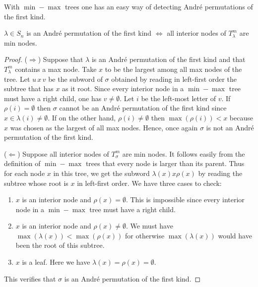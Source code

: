 With $\min-\max$ trees one has an easy way of detecting Andr\'e
permutations of the first kind.
\begin{prop}\label{minandre}
$\lambda \in S_n$ is an Andr\'e permutation of the first kind $\Leftrightarrow$
all interior nodes of $T_\lambda^m$ are min nodes.
\end{prop} 
\begin{proof} ($\Rightarrow$)  Suppose that $\lambda$ is an Andr\'e
permutation of the first kind and that $T^m_\lambda$ contains a max node.
Take $x$ to be the largest among all max nodes of the tree.
Let 
$u\,x\,v$ be the subword of $\sigma$ obtained by reading in left-first
order the subtree that has $x$ as it root. Since every interior node
in a $\min-\max$ tree must have a right child, one has $v \neq \emptyset$.
Let $i$ be the left-most letter of $v$.
If $\rho(i) =\emptyset$ then   $\sigma$ cannot be an Andr\'e 
permutation of the first kind since $x \in \lambda(i) \neq \emptyset$.  If 
on the other hand, $\rho(i) \neq \emptyset$ then $\max (\rho(i)) < x$
because $x$ was chosen as the largest of all max nodes.
Hence, once again $\sigma$ is not an Andr\'e permutation of the first kind.


\noindent
($\Leftarrow$) Suppose all interior nodes of $T_\sigma^m$ are min nodes.
It follows easily from the definition of $\min-\max$ trees that every node is larger
than its parent. Thus for each  node $x$ in this tree, we get the subword $\lambda(x) x \rho(x)$
by reading the subtree whose root is $x$  in left-first order.
We have three cases to check:
\begin{enumerate}
\item $x$ is an interior node and $\rho(x) = \emptyset$.
This is impossible since every interior 
node in a $\min-\max$  tree must have a right child.
\item $x$ is an interior node and $\rho(x) \neq \emptyset$.
We must have $\max(\lambda(x)) < \max (\rho(x))$ for otherwise 
$\max(\lambda(x))$ would have been  the root of this subtree.
\item  $x$ is a leaf.  Here we have $\lambda(x) = \rho(x) = \emptyset$.
\end{enumerate}
This verifies that $\sigma$ is an Andr\'e permutation of the first kind.
\end{proof}


